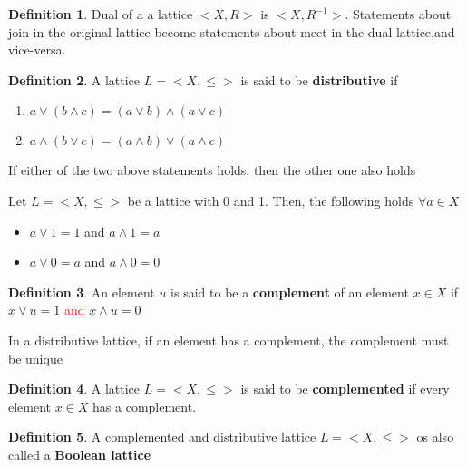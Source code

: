 \documentclass{article}
\theoremstyle{definition}
\newtheorem*{defi}{Definition}
\theoremstyle{definition}
\newenvironment{manualprop}[1]{%
  \renewcommand\themanualpropinner{#1}%
  \manualpropinner
}{\endmanualpropinner}
\theoremstyle{named}
\begin{document}
\begin{defi}
Dual of a a lattice $<X, R>$ is $<X, R^{-1}>$. Statements about join in the original lattice become statements about meet in the dual lattice,and vice-versa.
\end{defi}

\begin{defi}
A lattice $L = <X, \leq>$ is said to be \textbf{distributive} if 
  
\begin{enumerate}
    \item   $a \vee (b \wedge c) = (a \vee b) \wedge (a \vee c)$
    \item   $a \wedge (b \vee c) = (a \wedge b) \vee (a \wedge c)$
\end{enumerate}

\end{defi}
\begin{manualprop}{11}
If either of the two above statements holds, then the other one also holds
\end{manualprop}

\begin{manualprop}{12}
Let $L = <X, \leq>$ be a lattice with 0 and 1. Then, the following holds $\forall a \in X$
\begin{itemize}
    \item $a \vee 1 = 1$ and $ a \wedge 1 = a$
    \item $a \vee 0 = a$ and $ a \wedge 0 = 0$
\end{itemize}
\end{manualprop}

\begin{defi}
An element $u$ is said to be a \textbf{complement} of an element $x \in X$ if $x \vee u = 1$ \textcolor{red}{and} $x \wedge u = 0$ 
\end{defi}

\begin{manualprop}{13}
In a distributive lattice, if an element has a complement, the complement must be unique
\end{manualprop}

\begin{defi}
A lattice $L = <X, \leq>$ is said to be \textbf{complemented} if every element $x \in X$ has a complement.
\end{defi}

\begin{defi}
A complemented and distributive lattice $L = <X, \leq>$ os also called a \textbf{Boolean lattice}
\end{defi}
\end{document}
